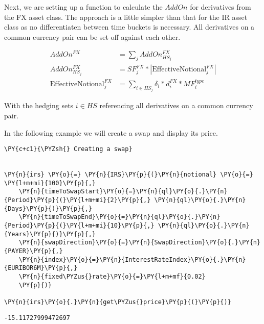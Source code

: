     

    
    Next, we are setting up a function to calculate the \(AddOn\) for
derivatives from the FX asset class. The approach is a little simpler
than that for the IR asset class as no differentiaten between time
buckets is necessary. All derivatives on a common currency pair can be
set off against each other.

\begin{align*}
AddOn^{FX} &= \sum_j{AddOn_{HS_j}^{FX}} \\
AddOn^{FX}_{HS_j} &= SF_j^{FX} * | \text{EffectiveNotional}_j^{FX} | \\
\text{EffectiveNotional}_j^{FX} &= \sum_{i \in HS_j}{\delta_i * d_i^{FX} * MF_i^{type}}
\end{align*}

With the hedging sets \(i \in HS\) referencing all derivatives on a
common currency pair.

    In the following example we will create a swap and display its price.

    \begin{tcolorbox}[breakable, size=fbox, boxrule=1pt, pad at break*=1mm,colback=cellbackground, colframe=cellborder]
\begin{Verbatim}[commandchars=\\\{\}]
\PY{c+c1}{\PYZsh{} Creating a swap}


\PY{n}{irs} \PY{o}{=} \PY{n}{IRS}\PY{p}{(}\PY{n}{notional} \PY{o}{=} \PY{l+m+mi}{100}\PY{p}{,}
    \PY{n}{timeToSwapStart}\PY{o}{=}\PY{n}{ql}\PY{o}{.}\PY{n}{Period}\PY{p}{(}\PY{l+m+mi}{2}\PY{p}{,} \PY{n}{ql}\PY{o}{.}\PY{n}{Days}\PY{p}{)}\PY{p}{,}
    \PY{n}{timeToSwapEnd}\PY{o}{=}\PY{n}{ql}\PY{o}{.}\PY{n}{Period}\PY{p}{(}\PY{l+m+mi}{10}\PY{p}{,} \PY{n}{ql}\PY{o}{.}\PY{n}{Years}\PY{p}{)}\PY{p}{,}
    \PY{n}{swapDirection}\PY{o}{=}\PY{n}{SwapDirection}\PY{o}{.}\PY{n}{PAYER}\PY{p}{,}
    \PY{n}{index}\PY{o}{=}\PY{n}{InterestRateIndex}\PY{o}{.}\PY{n}{EURIBOR6M}\PY{p}{,}
    \PY{n}{fixed\PYZus{}rate}\PY{o}{=}\PY{l+m+mf}{0.02}
    \PY{p}{)}

\PY{n}{irs}\PY{o}{.}\PY{n}{get\PYZus{}price}\PY{p}{(}\PY{p}{)}
\end{Verbatim}
\end{tcolorbox}

            \begin{tcolorbox}[breakable, size=fbox, boxrule=.5pt, pad at break*=1mm, opacityfill=0]
\begin{Verbatim}[commandchars=\\\{\}]
-15.11727999472697
\end{Verbatim}
\end{tcolorbox}
        

